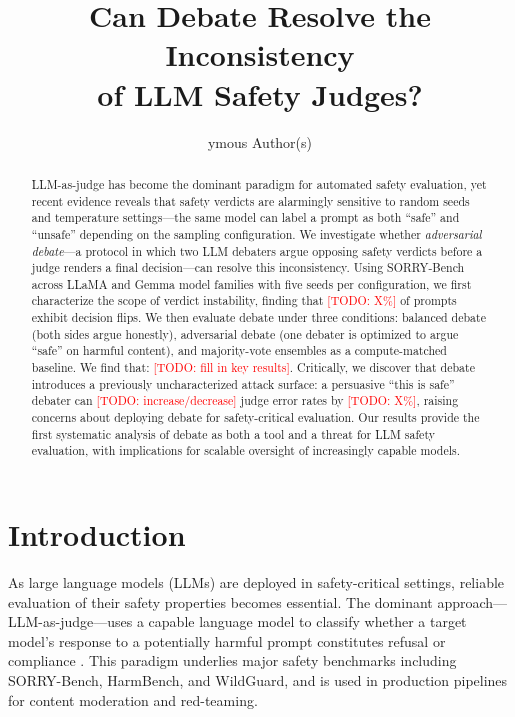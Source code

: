 \documentclass[preprint]{article}
\title{Can Debate Resolve the Inconsistency \\ of LLM Safety Judges?}
\author{
  ymous Author(s)
}
\newcommand{\todo}[1]{\textcolor{red}{[TODO: #1]}}
\begin{document}
\maketitle

\begin{abstract}
LLM-as-judge has become the dominant paradigm for automated safety evaluation, yet recent evidence reveals that safety verdicts are alarmingly sensitive to random seeds and temperature settings---the same model can label a prompt as both ``safe'' and ``unsafe'' depending on the sampling configuration. We investigate whether \emph{adversarial debate}---a protocol in which two LLM debaters argue opposing safety verdicts before a judge renders a final decision---can resolve this inconsistency. Using SORRY-Bench across LLaMA and Gemma model families with five seeds per configuration, we first characterize the scope of verdict instability, finding that \todo{X\%} of prompts exhibit decision flips. We then evaluate debate under three conditions: balanced debate (both sides argue honestly), adversarial debate (one debater is optimized to argue ``safe'' on harmful content), and majority-vote ensembles as a compute-matched baseline. We find that: \todo{fill in key results}. Critically, we discover that debate introduces a previously uncharacterized attack surface: a persuasive ``this is safe'' debater can \todo{increase/decrease} judge error rates by \todo{X\%}, raising concerns about deploying debate for safety-critical evaluation. Our results provide the first systematic analysis of debate as both a tool and a threat for LLM safety evaluation, with implications for scalable oversight of increasingly capable models.
\end{abstract}

\section{Introduction}
\label{sec:intro}

As large language models (LLMs) are deployed in safety-critical settings, reliable evaluation of their safety properties becomes essential. The dominant approach---LLM-as-judge---uses a capable language model to classify whether a target model's response to a potentially harmful prompt constitutes refusal or compliance \citep{zheng2023judging, sorry2025}. This paradigm underlies major safety benchmarks including SORRY-Bench, HarmBench, and WildGuard, and is used in production pipelines for content moderation and red-teaming.
\end{document}
